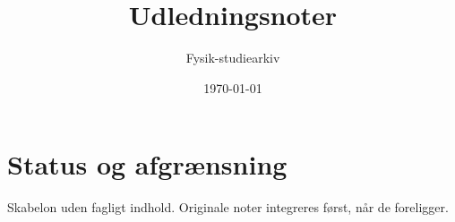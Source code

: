 \documentclass[11pt,a4paper,oneside]{book}
\begin{document}
\title{Udledningsnoter}
\author{Fysik-studiearkiv}\date{\today}\maketitle\tableofcontents
\chapter{Status og afgrænsning}
Skabelon uden fagligt indhold. Originale noter integreres først, når de foreligger.
\end{document}
